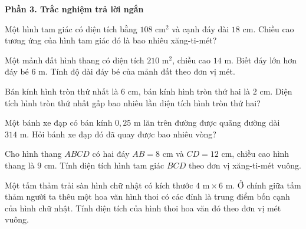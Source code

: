 \textbf{Phần 3. Trắc nghiệm trả lời ngắn}

\begin{ex} %
Một hình tam giác có diện tích bằng $108\text{ cm}^2$ và cạnh đáy dài $18\text{ cm}$. Chiều cao tương ứng của hình tam giác đó là bao nhiêu xăng-ti-mét?
\end{ex}

\begin{ex} %
Một mảnh đất hình thang có diện tích $210\text{ m}^2$, chiều cao $14\text{ m}$. Biết đáy lớn hơn đáy bé $6\text{ m}$. Tính độ dài đáy bé của mảnh đất theo đơn vị mét.
\end{ex}

\begin{ex} %
Bán kính hình tròn thứ nhất là $6\text{ cm}$, bán kính hình tròn thứ hai là $2\text{ cm}$. Diện tích hình tròn thứ nhất gấp bao nhiêu lần diện tích hình tròn thứ hai?
\end{ex}

\begin{ex} %
Một bánh xe đạp có bán kính $0{,}25\text{ m}$ lăn trên đường được quãng đường dài $314\text{ m}$. Hỏi bánh xe đạp đó đã quay được bao nhiêu vòng?
\end{ex}

\begin{ex} %
Cho hình thang $ABCD$ có hai đáy $AB = 8\text{ cm}$ và $CD = 12\text{ cm}$, chiều cao hình thang là $9\text{ cm}$. Tính diện tích hình tam giác $BCD$ theo đơn vị xăng-ti-mét vuông.
\end{ex}

\begin{ex} %
Một tấm thảm trải sàn hình chữ nhật có kích thước $4\text{ m} \times 6\text{ m}$. Ở chính giữa tấm thảm người ta thêu một hoa văn hình thoi có các đỉnh là trung điểm bốn cạnh của hình chữ nhật. Tính diện tích của hình thoi hoa văn đó theo đơn vị mét vuông.
\end{ex}
